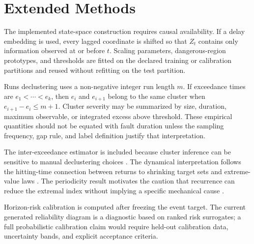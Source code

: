 \section{Extended Methods}
\label{supp:methods}

The implemented state-space construction requires causal availability. If a delay embedding is used, every lagged coordinate is shifted so that \(Z_t\) contains only information observed at or before \(t\). Scaling parameters, dangerous-region prototypes, and thresholds are fitted on the declared training or calibration partitions and reused without refitting on the test partition.

Runs declustering uses a non-negative integer run length \(m\). If exceedance times are \(e_1<\cdots<e_k\), then \(e_i\) and \(e_{i+1}\) belong to the same cluster when \(e_{i+1}-e_i\le m+1\). Cluster severity may be summarized by size, duration, maximum observable, or integrated excess above threshold. These empirical quantities should not be equated with fault duration unless the sampling frequency, gap rule, and label definition justify that interpretation.

The inter-exceedance estimator is included because cluster inference can be sensitive to manual declustering choices \citep{FerroSegers2003Clusters}. The dynamical interpretation follows the hitting-time connection between returns to shrinking target sets and extreme-value laws \citep{Freitas2008Hitting}. The periodicity result motivates the caution that recurrence can reduce the extremal index without implying a specific mechanical cause \citep{Freitas2012Periodicity}.

Horizon-risk calibration is computed after freezing the event target. The current generated reliability diagram is a diagnostic based on ranked risk surrogates; a full probabilistic calibration claim would require held-out calibration data, uncertainty bands, and explicit acceptance criteria.

